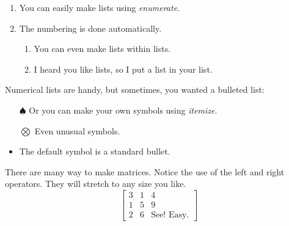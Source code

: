 


\begin{enumerate}
  \item You can easily make lists using \emph{enumerate}.
  \item The numbering is done automatically.

    \begin{enumerate}
      \item You can even make lists within lists.
      \item I heard you like lists, so I put a list in your list.
    \end{enumerate}

\end{enumerate}

Numerical lists are handy, but sometimes, you wanted a bulleted list:

\begin{itemize}
  \item[$\spadesuit$] Or you can make your own symbols using \emph{itemize}.
  \item[$\bigotimes$] Even unusual symbols.
  \item The default symbol is a standard bullet.
\end{itemize}

There are many way to make matrices.  Notice the use of the left and right operators.  They will stretch to any size you like.
\[
\left[
\begin{array}{rl|c}%
3 & 1 & 4 \\
1 & 5 & 9 \\
\hline
2 & 6 & \text{See!  Easy.}
\end{array}
\right]
\]

